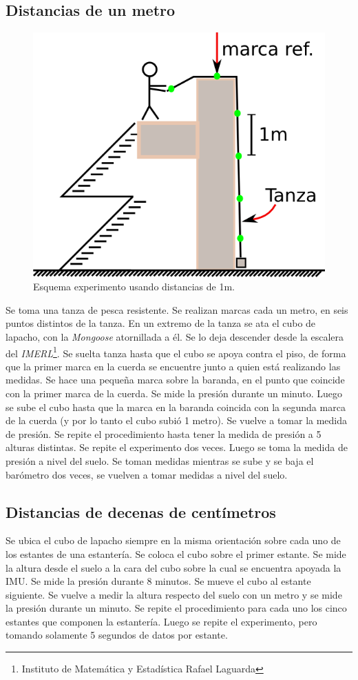 \documentclass[spanish,12pt,a4paper,titlepage]{report}
\begin{document}
\subsection{Distancias de un metro}

\begin{figure}
\hspace{20pt}
  \includegraphics[width=.5\textwidth]{./pics/imerl.png}
  \caption{Esquema experimento usando distancias de 1m.}
  \label{fig:imerl.png}
\end{figure}

Se toma una tanza de pesca resistente. Se realizan marcas cada un metro, en seis puntos distintos de la tanza. En un extremo de la tanza se ata el cubo de lapacho, con la \emph{Mongoose} atornillada a él. Se lo deja descender desde la escalera del \emph{IMERL}\footnote{Instituto de Matemática y Estadística Rafael Laguarda}. Se suelta tanza hasta que el cubo se apoya contra el piso, de forma que la primer marca en la cuerda se encuentre junto a quien está realizando las medidas. Se hace una pequeña marca sobre la baranda, en el punto que coincide con la primer marca de la cuerda. Se mide la presión durante un minuto. Luego se sube el cubo hasta que la marca en la baranda coincida con la segunda marca de la cuerda (y por lo tanto el cubo subió 1 metro). Se vuelve a tomar la medida de presión. Se repite el procedimiento hasta tener la medida de presión a 5 alturas distintas. 
Se repite el experimento dos veces. Luego se toma la medida de presión a nivel del suelo. Se toman medidas mientras se sube y se baja el barómetro dos veces, se vuelven a tomar medidas a nivel del suelo.

\subsection{Distancias de decenas de centímetros}

Se ubica el cubo de lapacho siempre en la misma orientación sobre cada uno de los estantes de una estantería. Se coloca el cubo sobre el primer estante. Se mide la altura desde el suelo a la cara del cubo sobre la cual se encuentra apoyada la IMU. Se mide la presión durante 8 minutos. Se mueve el cubo al estante siguiente. Se vuelve a medir la altura respecto del suelo con un metro y se mide la presión durante un minuto. Se repite el procedimiento para cada uno los cinco estantes que componen la estantería. Luego se repite el experimento, pero tomando solamente 5 segundos de datos por estante.
\end{document}
